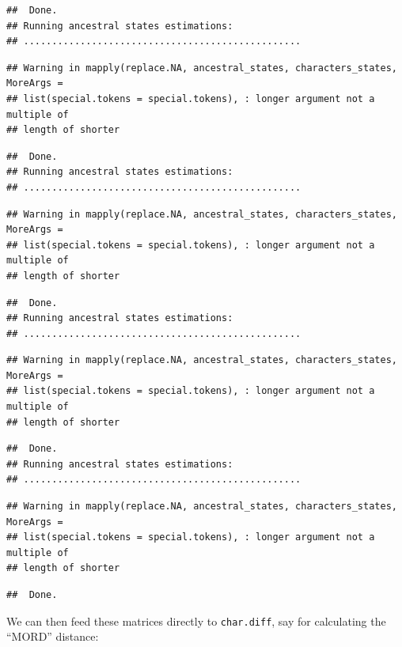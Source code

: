 \documentclass[
]{book}
\begin{document}
\begin{verbatim}
##  Done.
## Running ancestral states estimations:
## .................................................
\end{verbatim}

\begin{verbatim}
## Warning in mapply(replace.NA, ancestral_states, characters_states, MoreArgs =
## list(special.tokens = special.tokens), : longer argument not a multiple of
## length of shorter
\end{verbatim}

\begin{verbatim}
##  Done.
## Running ancestral states estimations:
## .................................................
\end{verbatim}

\begin{verbatim}
## Warning in mapply(replace.NA, ancestral_states, characters_states, MoreArgs =
## list(special.tokens = special.tokens), : longer argument not a multiple of
## length of shorter
\end{verbatim}

\begin{verbatim}
##  Done.
## Running ancestral states estimations:
## .................................................
\end{verbatim}

\begin{verbatim}
## Warning in mapply(replace.NA, ancestral_states, characters_states, MoreArgs =
## list(special.tokens = special.tokens), : longer argument not a multiple of
## length of shorter
\end{verbatim}

\begin{verbatim}
##  Done.
## Running ancestral states estimations:
## .................................................
\end{verbatim}

\begin{verbatim}
## Warning in mapply(replace.NA, ancestral_states, characters_states, MoreArgs =
## list(special.tokens = special.tokens), : longer argument not a multiple of
## length of shorter
\end{verbatim}

\begin{verbatim}
##  Done.
\end{verbatim}

We can then feed these matrices directly to \texttt{char.diff}, say for calculating the ``MORD'' distance:
\end{document}
